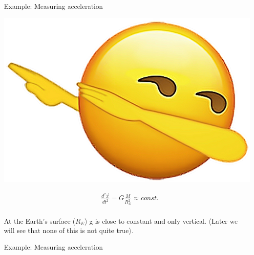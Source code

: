 \begin{frame}
  \begin{PointSix}{Example: Measuring acceleration}
    \begin{minipage}[t]{0.3\textwidth}
      \includegraphics[width=\textwidth]{Figures/General/IcandothisSmiley_Kindpng.png}
      \end{minipage}\begin{minipage}[]{0.7\textwidth}
    \centering
    \begin{align*}
    &\frac{d^2\vec{x}}{dt^2} = G\frac{M}{R_E^2} \approx const. \\
    \end{align*}
  \end{minipage}
    At the Earth's surface ($R_E$) g is close to constant and only vertical. (Later we will see that none of this is not quite true).
    
  \end{PointSix}
\end{frame}

\begin{frame}
    \begin{PointSix}{Example: Measuring acceleration}
    \end{PointSix}   
\end{frame}

